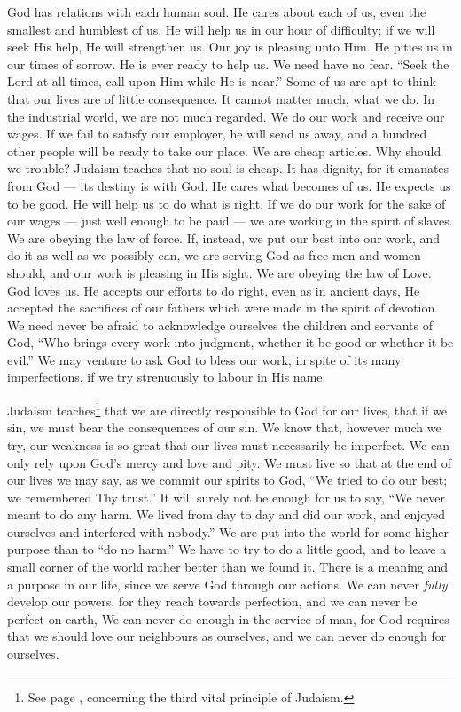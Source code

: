 God has relations with each human soul.
He cares about each of us, even the smallest
and humblest of us. He will help us in
our hour of difficulty; if we will seek His
help, He will strengthen us. Our joy is
pleasing unto Him. He pities us in our
times of sorrow. He is ever ready to help
us. We need have no fear. “Seek the
Lord at all times, call upon Him while He
is near.” Some of us are apt to think that
our lives are of little consequence. It cannot
matter much, what we do. In the industrial
world, we are not much regarded. We do
our work and receive our wages. If we fail
to satisfy our employer, he will send us
away, and a hundred other people will be
ready to take our place. We are cheap
articles. Why should we trouble? Judaism
teaches that no soul is cheap. It has dignity,
for it emanates from God — its destiny is
with God. He cares what becomes of us.
He expects us to be good. He will help
us to do what is right. If we do our work
for the sake of our wages — just well enough
to be paid — we are working in the spirit of
slaves. We are obeying the law of force.
If, instead, we put our best into our work,
and do it as well as we possibly can, we
are serving God as free men and women
should, and our work is pleasing in His
sight. We are obeying the law of Love.
God loves us. He accepts our efforts to do
right, even as in ancient days, He accepted
the sacrifices of our fathers which were
made in the spirit of devotion. We need
never be afraid to acknowledge ourselves
the children and servants of God, “Who
brings every work into judgment, whether
it be good or whether it be evil.” We
may venture to ask God to bless our
work, in spite of its many imperfections,
if we try strenuously to labour in His
name.

Judaism teaches\footnote{See page \pageref{responsibility}, concerning the third vital principle of Judaism.}
that we are directly responsible
to God for our lives, that if we
sin, we must bear the consequences of our
sin. We know that, however much we try,
our weakness is so great that our lives must
necessarily be imperfect. We can only rely
upon God’s mercy and love and pity. We
must live so that at the end of our lives
we may say, as we commit our spirits to
God, “We tried to do our best; we remembered
Thy trust.” It will surely not be
enough for us to say, “We never meant to
do any harm. We lived from day to day
and did our work, and enjoyed ourselves
and interfered with nobody.” We are put
into the world for some higher purpose than
to “do no harm.” We have to try to do
a little good, and to leave a small corner
of the world rather better than we found
it. There is a meaning and a purpose
in our life, since we serve God through
our actions. We can never \textsl{fully} develop
our powers, for they reach towards perfection,
and we can never be perfect on
earth, We can never do enough in the
service of man, for God requires that we
should love our neighbours as ourselves,
and we can never do enough for ourselves.

